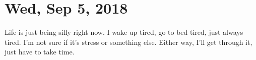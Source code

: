 \section{Wed, Sep 5, 2018}

Life is just being silly right now. I wake up tired, go to bed tired, just always
tired. I'm not sure if it's stress or something else. Either way, I'll get through
it, just have to take time.